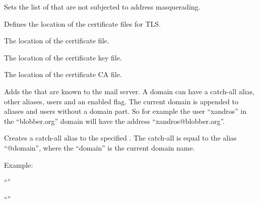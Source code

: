 
Sets the list of  that are not subjected to address masquerading.


Defines the location of the certificate files for TLS.


The location of the certificate file.


The location of the certificate key file.


The location of the certificate CA file.


Adds the  that are known to the mail server. A domain can have a catch-all
alias, other aliases, users and an enabled flag. The current domain is appended
to aliases and users without a domain part. So for example the user ``xandros''
in the ``blobber.org'' domain will have the address ``xandros@blobber.org''.


Creates a catch-all alias to the specified . The catch-all is equal
to the alias ``@domain'', where the ``domain'' is the current domain name.

Example:

\begin{compactitem}
\item ``''
\item ``''
\end{compactitem}


